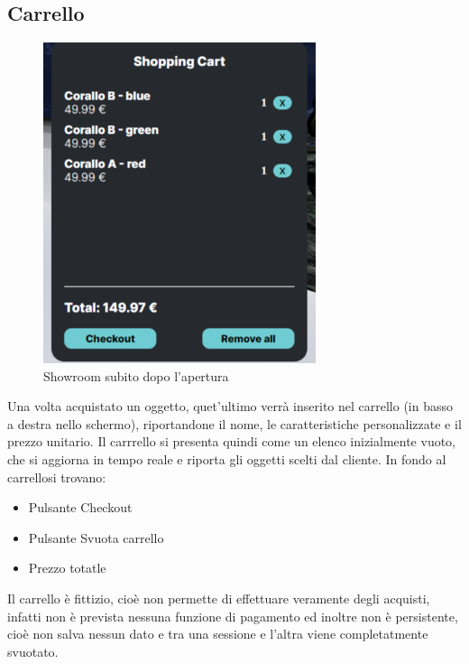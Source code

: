 \subsection{Carrello}
\begin{figure}[H]
  \renewcommand{\thefigure}{2}
\begin{center}
  \includegraphics[width=8cm]{./res/images/carrello.png}
\end{center}
  \caption{Showroom subito dopo l'apertura}
  \label{Showroom subito dopo l'apertura}
\end{figure}

Una volta acquistato un oggetto, quet'ultimo verrà inserito nel carrello (in basso a destra nello schermo), riportandone il nome, le caratteristiche personalizzate e il prezzo unitario.
Il carrrello si presenta quindi come un elenco inizialmente vuoto, che si aggiorna in tempo reale e riporta gli oggetti scelti dal cliente.
In fondo al carrellosi trovano:
\begin{itemize}
	\item Pulsante Checkout
	\item Pulsante Svuota carrello
	\item Prezzo totatle
\end{itemize}
Il carrello è fittizio, cioè non permette di effettuare veramente degli acquisti, infatti non è prevista nessuna funzione di pagamento ed inoltre non è persistente, cioè non salva nessun dato e tra una sessione e l'altra viene completatmente svuotato.
\pagebreak

